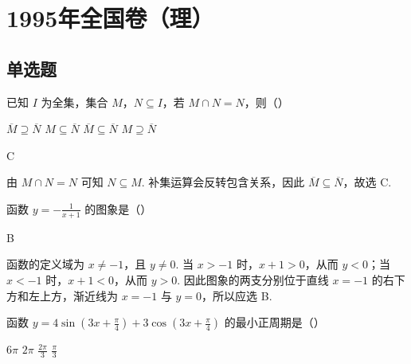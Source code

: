 \chapter{1995年全国卷（理）}
\section{单选题}

\begin{problem}
已知 \(I\) 为全集，集合 \(M\)，\(N \subseteq I\)，若 \(M \cap N = N\)，则（\quad）

\choices
    {\(\overline{M} \supseteq \overline{N}\)}
    {\(M \subseteq \overline{N}\)}
    {\(\overline{M} \subseteq \overline{N}\)}
    {\(M \supseteq \overline{N}\)}
\end{problem}

\begin{answer}
C
\end{answer}

\begin{solution}
由 \(M\cap N=N\) 可知 \(N\subseteq M\). 补集运算会反转包含关系，因此 \(\overline{M}\subseteq\overline{N}\)，故选 C.
\end{solution}

\begin{problem}
函数 \(y = -\frac{1}{x + 1} \) 的图象是（\quad）

    {}
    {}
    {}
\end{problem}

\begin{answer}
B
\end{answer}

\begin{solution}
函数的定义域为 \(x\ne-1\)，且 \(y\ne0\). 当 \(x>-1\) 时，\(x+1>0\)，从而 \(y<0\)；当 \(x<-1\) 时，\(x+1<0\)，从而 \(y>0\). 因此图象的两支分别位于直线 \(x=-1\) 的右下方和左上方，渐近线为 \(x=-1\) 与 \(y=0\)，所以应选 B.
\end{solution}

\begin{problem}
函数 \(y = 4\sin \left(3x + \frac{\pi}{4}\right) + 3\cos \left(3x + \frac{\pi}{4}\right) \) 的最小正周期是（\quad）

\choices
    {\(6\pi\)}
    {\(2\pi\)}
    {\(\frac{2\pi}{3} \)}
    {\(\frac{\pi}{3} \)}
\end{problem}

